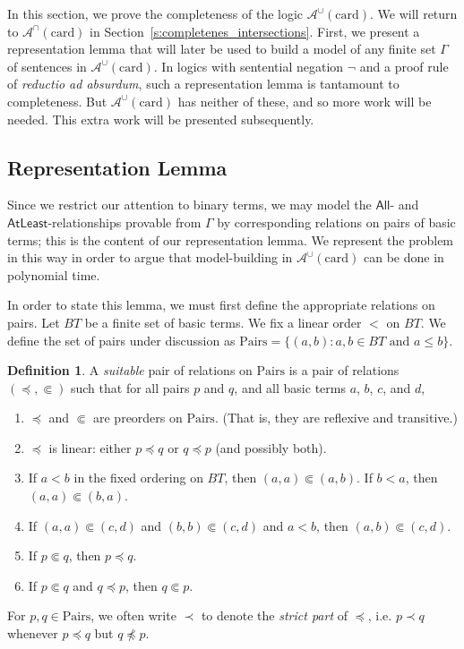 \documentclass[letterpaper]{article} %
\theoremstyle{definition}
\newtheorem{definition}[theorem]{Definition}
\newcommand{\set}[1]{\{ #1 \}}
\newcommand{\nott}{\neg}
\newcommand{\Aunion}{\mathscr{A}^{\cup}}
\newcommand{\Ainter}{\mathscr{A}^{\cap}}
\newcommand{\AllNoArgs}{\mathsf{All}}
\newcommand{\AtleastNoArgs}{\mathsf{AtLeast}}
\newcommand{\card}{\mathrm{card}}
\newcommand{\Pairs}{\mbox{Pairs}}
\newcommand{\precsubseteq}{\Subset}
\newcommand{\suitable}{suitable}%
\begin{document}
In this section, we prove the completeness of the logic $\Aunion(\card)$.  We will return to $\Ainter(\card)$ in Section~\ref{s:completenes_intersections}. First, we present a representation lemma that will later be used to build a model of any finite set $\Gamma$ of sentences in $\Aunion(\card)$.
In logics with sentential negation $\nott$ and a proof rule of \emph{reductio ad absurdum}, such a representation lemma is tantamount to completeness.  But $\Aunion(\card)$ has neither of these, and so more work will be needed.  This extra work will be presented subsequently.


\subsection{Representation Lemma}
\label{subsection-representation}

Since we restrict our attention to binary terms, we may model the $\AllNoArgs$- and $\AtleastNoArgs$-relationships provable from $\Gamma$ by corresponding relations on pairs of basic terms; this is the content of our representation lemma.  We represent the problem in this way in order to argue that model-building in $\Aunion(\card)$ can be done in polynomial time.

In order to state this lemma, we must first define the appropriate relations on pairs.
Let $BT$ be a finite set of basic terms.  We fix a linear order $<$ on $BT$.
We define the set of pairs under discussion as $\Pairs = \set{(a, b) : a, b \in BT \textrm{ and } a \leq b}$.

\begin{definition}
A \emph{\suitable}
pair of relations on $\Pairs$ 
is a pair of relations $(\preceq, \precsubseteq)$ such that for all pairs $p$ and $q$, and all basic terms $a$, $b$, $c$, and $d$,

\begin{enumerate}
\item $\preceq$ and $\precsubseteq$ are preorders on $\Pairs$.
(That is, they are reflexive and transitive.)
\item   $\preceq$ is linear:
 either $p \preceq q$ or $q \preceq p$ (and possibly both).
 \item If $a < b$ in the fixed ordering on $BT$, then $(a,a) \precsubseteq (a,b)$.  If $b < a$, then $(a,a) \precsubseteq (b,a)$. 
 \item If $(a,a) \precsubseteq (c,d)$ and $(b,b) \precsubseteq (c,d)$ and $a < b$,
 then $(a,b) \precsubseteq (c,d)$.
\item If $p \precsubseteq q$, then $p\preceq q$.
\item If $p \precsubseteq q$ and $q\preceq p$, then $q \precsubseteq p$.
\end{enumerate}

For $p,q \in \Pairs$, we often write $\prec$ to denote the \emph{strict part} of $\preceq$, i.e. $p \prec q$ whenever $p \preceq q$ but $q \not \preceq p$.
\label{def-suitable-pair-first}
\end{definition}
\end{document}
